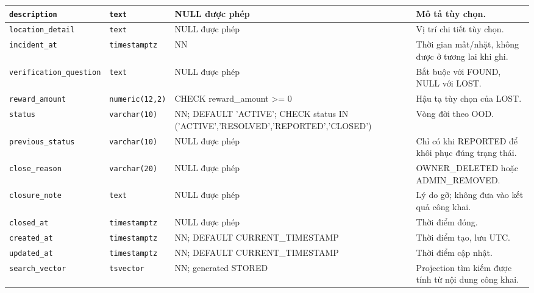 \begin{longtable}{|>{\raggedright\arraybackslash}p{.20\linewidth}|>{\raggedright\arraybackslash}p{.14\linewidth}|>{\raggedright\arraybackslash}p{.31\linewidth}|>{\raggedright\arraybackslash}p{.27\linewidth}|}
\texttt{description} & \texttt{text} & NULL được phép & Mô tả tùy chọn. \\ \hline

\texttt{location\_\allowbreak{}detail} & \texttt{text} & NULL được phép & Vị trí chi tiết tùy chọn. \\ \hline

\texttt{incident\_\allowbreak{}at} & \texttt{timestamptz} & NN & Thời gian mất/nhặt,\allowbreak{} không được ở tương lai khi ghi. \\ \hline

\texttt{verification\_\allowbreak{}question} & \texttt{text} & NULL được phép & Bắt buộc với FOUND,\allowbreak{} NULL với LOST. \\ \hline

\texttt{reward\_\allowbreak{}amount} & \texttt{numeric(12,\allowbreak{}2)} & CHECK reward\_\allowbreak{}amount >= 0 & Hậu tạ tùy chọn của LOST. \\ \hline

\texttt{status} & \texttt{varchar(10)} & NN; DEFAULT 'ACTIVE'; CHECK status IN ('ACTIVE',\allowbreak{}'RESOLVED',\allowbreak{}'REPORTED',\allowbreak{}'CLOSED') & Vòng đời theo OOD. \\ \hline

\texttt{previous\_\allowbreak{}status} & \texttt{varchar(10)} & NULL được phép & Chỉ có khi REPORTED để khôi phục đúng trạng thái. \\ \hline

\texttt{close\_\allowbreak{}reason} & \texttt{varchar(20)} & NULL được phép & OWNER\_\allowbreak{}DELETED hoặc ADMIN\_\allowbreak{}REMOVED. \\ \hline

\texttt{closure\_\allowbreak{}note} & \texttt{text} & NULL được phép & Lý do gỡ; không đưa vào kết quả công khai. \\ \hline

\texttt{closed\_\allowbreak{}at} & \texttt{timestamptz} & NULL được phép & Thời điểm đóng. \\ \hline

\texttt{created\_\allowbreak{}at} & \texttt{timestamptz} & NN; DEFAULT CURRENT\_\allowbreak{}TIMESTAMP & Thời điểm tạo,\allowbreak{} lưu UTC. \\ \hline

\texttt{updated\_\allowbreak{}at} & \texttt{timestamptz} & NN; DEFAULT CURRENT\_\allowbreak{}TIMESTAMP & Thời điểm cập nhật. \\ \hline

\texttt{search\_\allowbreak{}vector} & \texttt{tsvector} & NN; generated STORED & Projection tìm kiếm được tính từ nội dung công khai. \\ \hline

\end{longtable}

